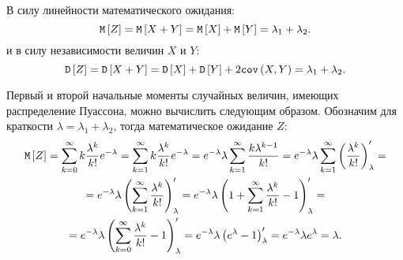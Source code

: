 В силу линейности математического ожидания:
\begin{equation}
    \mathtt{M} \left [ Z \right ]
    = \mathtt{M} \left [ X + Y \right ]
    = \mathtt{M} \left [ X \right ] + \mathtt{M} \left [ Y \right ]
    = \lambda_1 + \lambda_2 .
\end{equation}
и в силу независимости величин $X$ и $Y$:
\begin{equation}
    \mathtt{D} \left [ Z \right ]
    = \mathtt{D} \left [ X + Y \right ]
    = \mathtt{D} \left [ X \right ] + \mathtt{D} \left [ Y \right ] + 2 \texttt{cov} \left ( X , Y \right )
    = \lambda_1 + \lambda_2 .
\end{equation}

Первый и второй начальные моменты случайных величин, имеющих распределение Пуассона, можно вычислить следующим образом. Обозначим для краткости $\lambda = \lambda_1 + \lambda_2$,
тогда математическое ожидание $Z$:
\begin{multline}
    \mathtt{M} \left [ Z \right ]
    = \sum_{k=0}^{\infty} k \frac{\lambda^k}{k!} e^{-\lambda}
    = \sum_{k=1}^{\infty} k \frac{\lambda^k}{k!} e^{-\lambda}
    = e^{-\lambda} \lambda \sum_{k=1}^{\infty} \frac{k \lambda^{k-1}}{k!}
    = e^{-\lambda} \lambda \sum_{k=1}^{\infty} \left ( \frac{\lambda^k}{k!} \right )_{\lambda}^{\prime} = \\
    = e^{-\lambda} \lambda \left ( \sum_{k=1}^{\infty} \frac{\lambda^k}{k!} \right )_{\lambda}^{\prime}
    = e^{-\lambda} \lambda \left ( 1 + \sum_{k=1}^{\infty} \frac{\lambda^k}{k!} - 1 \right )_{\lambda}^{\prime} = \\
    = e^{-\lambda} \lambda \left ( \sum_{k=0}^{\infty} \frac{\lambda^k}{k!} - 1 \right )_{\lambda}^{\prime}
    = e^{-\lambda} \lambda \left ( e^\lambda - 1 \right )_{\lambda}^{\prime}
    = e^{-\lambda} \lambda e^\lambda
    = \lambda .
\end{multline}

